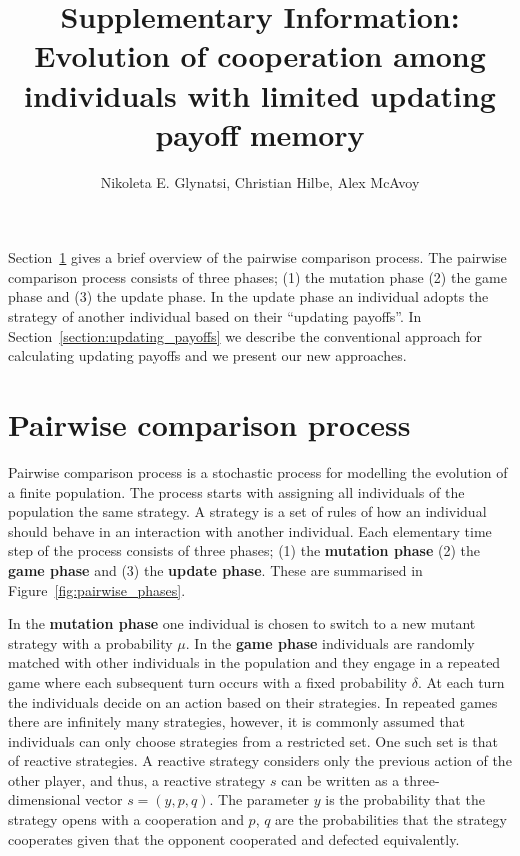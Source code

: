 \documentclass[11pt]{article}
\title{\bf  \sffamily \LARGE Supplementary Information: Evolution of cooperation among individuals with
limited updating payoff memory\\}
\date{}
\author{Nikoleta E. Glynatsi, Christian Hilbe, Alex McAvoy}
\theoremstyle{plainCl1}
\theoremstyle{plainCl2}
\begin{document}
\maketitle

Section~\ref{section:pairwise_comparison} gives a brief overview of the pairwise
comparison process. The pairwise comparison process consists of three phases;
(1) the mutation phase (2) the game phase and (3) the update phase. In the update
phase an individual adopts the strategy of another individual based on their
``updating payoffs''. In Section~\ref{section:updating_payoffs} we
describe the conventional approach for calculating updating payoffs and we
present our new approaches.

\section{Pairwise comparison process}\label{section:pairwise_comparison}

Pairwise comparison process is a stochastic process for modelling the evolution
of a finite population. The process starts with assigning all individuals of the
population the same strategy. A strategy is a set of rules of how an individual
should behave in an interaction with another individual. Each elementary time
step of the process consists of three phases; (1) the \textbf{mutation phase}
(2) the \textbf{game phase} and (3) the \textbf{update phase}. These are summarised
in Figure~\ref{fig:pairwise_phases}.

In the \textbf{mutation phase} one individual is
chosen to switch to a new mutant strategy with a probability \(\mu\).
In the \textbf{game phase} individuals are randomly matched with other
individuals in the population and they engage in a repeated game where each
subsequent turn occurs with a fixed probability \(\delta\). At each turn the
individuals decide on an action based on their strategies.
In repeated games there are infinitely many strategies, however, it is commonly
assumed that individuals can only choose strategies from a restricted set. One
such set is that of reactive strategies. A reactive
strategy considers only the previous action of the other player, and thus, a
reactive strategy \(s\) can be written as a three-dimensional vector \(s=(y, p,
q)\). The parameter \(y\) is the probability that the strategy opens with a
cooperation and \(p\), \(q\) are the probabilities that the strategy cooperates
given that the opponent cooperated and defected equivalently.
\end{document}
